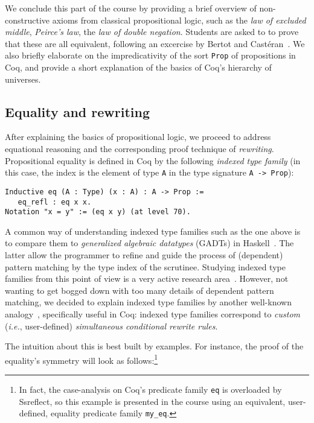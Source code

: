 \documentclass[blockstyle,preprint,nocopyrightspace]{sigplanconf}
\newcommand{\is}[1]{\textcolor{blue}{(Ilya: {#1})}}
\newcommand{\code}[1]{\lstinline{#1}}
\newcommand{\ie}{\emph{i.e.}\xspace}
\begin{document}
We conclude this part of the course by providing a brief overview of
non-constructive axioms from classical propositional logic, such as
the \emph{law of excluded middle}, \emph{Peirce's law}, the \emph{law
  of double negation}. Students are asked to to prove that these are
all equivalent, following an excercise by Bertot and
Cast\'{e}ran~\cite{Bertot-Casteran:BOOK}. We also briefly elaborate on
the impredicativity of the sort \code{Prop} of propositions in Coq,
and provide a short explanation of the basics of Coq's hierarchy of
universes.

\subsection{Equality and rewriting}
\label{sec:rewriting}

After explaining the basics of propositional logic, we proceed to
address equational reasoning and the corresponding proof technique of
\emph{rewriting}. Propositional equality is defined in Coq by the
following \emph{indexed type family} (in this case, the index is the
element of type \code{A} in the type signature \code{A -> Prop}):
%
\begin{lstlisting}
Inductive eq (A : Type) (x : A) : A -> Prop :=  
   eq_refl : eq x x.
Notation "x = y" := (eq x y) (at level 70).
\end{lstlisting}
%
A common way of understanding indexed type families such as the one
above is to compare them to \emph{generalized algebraic datatypes}
(GADTs) in Haskell~\cite{PeytonJones-al:ICFP06,Xi-al:POPL03}. The
latter allow the programmer to refine and guide the process of
(dependent) pattern matching by the type index of the
scrutinee. Studying indexed type families from this point of view is a
very active research
area~\cite{Morris-al:FCS09,Dagand-McBride:ICFP12}.
%
However, not wanting to get bogged down with too many details of
dependent pattern matching, we decided to explain indexed type
families by another well-known analogy~\cite{Paulin-Mohring:TLCA93},
%
%
specifically useful in Coq: indexed type families correspond to
\emph{custom} (\ie, user-defined) \emph{simultaneous conditional
  rewrite rules}.

The intuition about this is best built by examples. For instance, the
proof of the equality's symmetry will look as follows:\footnote{In
  fact, the case-analysis on Coq's predicate family \code{eq} is
  overloaded by Ssreflect, so this example is presented in the course
  using an equivalent, user-defined, equality predicate family
  \code{my_eq}.}
\end{document}
